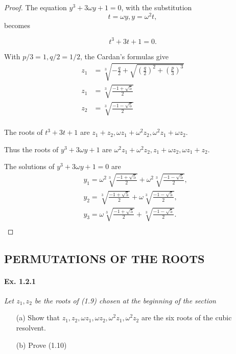 \documentclass[11pt,a4paper]{article}
\begin{document}
\begin{proof}
The equation $y^3+3\omega y +1 =0$,  with the substitution $$t = \omega y, y =\omega^2 t,$$ becomes

$$t^3+3t+1 = 0.$$

 With $p/3 = 1, q/2 = 1/2$, the Cardan's formulas give
\begin{align*}
z_1 &= \sqrt[3]{-\frac{q}{2}+\sqrt{\left(\frac{q}{2}\right)^2 + \left(\frac{p}{3}\right)^3}}\\
z_1 &=\sqrt[3]{\frac{-1+\sqrt{5}}{2}}\\
z_2 &=\sqrt[3]{\frac{-1-\sqrt{5}}{2}}\\
\end{align*}

The roots of $t^3+3t+1$ are  $z_1+z_2,\omega z_1+\omega^2 z_2,\omega^2 z_1 + \omega z_2$.

Thus the roots of  $y^3+3\omega y + 1$ are $\omega^2 z_1 + \omega^2 z_2,z_1 + \omega z_2, \omega z_1 + z_2$.

The solutions of  $y^3+3\omega y +1 =0$ are
\begin{align*}
&y_1 = \omega^2  \sqrt[3]{\frac{-1+\sqrt{5}}{2}} + \omega ^2 \sqrt[3]{\frac{-1-\sqrt{5}}{2}},\\
&y_2 =  \sqrt[3]{\frac{-1+\sqrt{5}}{2}} + \omega \sqrt[3]{\frac{-1-\sqrt{5}}{2}},\\
&y_3 = \omega \sqrt[3]{\frac{-1+\sqrt{5}}{2}} + \sqrt[3]{\frac{-1-\sqrt{5}}{2}}.\\
\end{align*}
\end{proof}

\subsection{PERMUTATIONS OF THE ROOTS}

\paragraph{Ex. 1.2.1}

{\it Let $z_1,z_2$ be the roots of (1.9) chosen at the beginning of the section
\begin{enumerate}
\item[(a)] Show that $z_1,z_2,\omega z_1,\omega z_2, \omega^2 z_1, \omega^2 z_2$ are the six roots of the cubic resolvent.
\item[(b)] Prove (1.10)
\end{enumerate}
}
\end{document}
